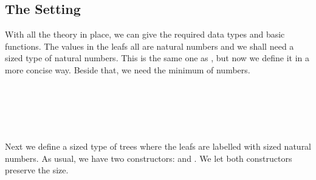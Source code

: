\subsection{The Setting}
With all the theory in place, we can give the required data types and basic functions.
The values in the leafs all are natural numbers and we shall need a sized type of natural numbers.
This is the same one as , but now we define it in a more concise way.
Beside that, we need the minimum of numbers.

\begin{code}%
\>[0]\AgdaSpace{}%
\AgdaSymbol{:}\AgdaSpace{}%
\<%
\\
\>[0]\AgdaSpace{}%
\AgdaSymbol{=}\AgdaSpace{}%
\AgdaSpace{}%
\<%
\\
%
\\[\AgdaEmptyExtraSkip]%
\>[0]\AgdaSpace{}%
\AgdaSymbol{:}\AgdaSpace{}%
\AgdaFunction{\&}\AgdaSymbol{(}\AgdaSpace{}%
\AgdaSpace{}%
\AgdaSpace{}%
\AgdaSpace{}%
\AgdaSymbol{)}\<%
\\
\>[0]\AgdaSpace{}%
\AgdaSpace{}%
\AgdaSpace{}%
\AgdaSymbol{=}\AgdaSpace{}%
\AgdaSpace{}%
\AgdaSpace{}%
\<%
\end{code}

Next we define a sized type of trees where the leafs are labelled with sized natural numbers.
As usual, we have two constructors:  and .
We let both constructors preserve the size.

\begin{code}%
\>[0]\AgdaSpace{}%
\AgdaSpace{}%
\AgdaSymbol{(}\AgdaSpace{}%
\AgdaSymbol{:}\AgdaSpace{}%
\AgdaSymbol{)}\AgdaSpace{}%
\AgdaSymbol{:}\AgdaSpace{}%
\AgdaSpace{}%
\<%
\\
\>[0][@{}l@{\AgdaIndent{0}}]%
\>[2]\AgdaSpace{}%
\AgdaSymbol{:}\AgdaSpace{}%
\AgdaSpace{}%
\AgdaSpace{}%
\AgdaSpace{}%
\AgdaSpace{}%
\<%
\\
%
\>[2]\AgdaSpace{}%
\AgdaSymbol{:}\AgdaSpace{}%
\AgdaSpace{}%
\AgdaSpace{}%
\AgdaSpace{}%
\AgdaSpace{}%
\AgdaSpace{}%
\AgdaSpace{}%
\AgdaSpace{}%
\<%
\end{code}

